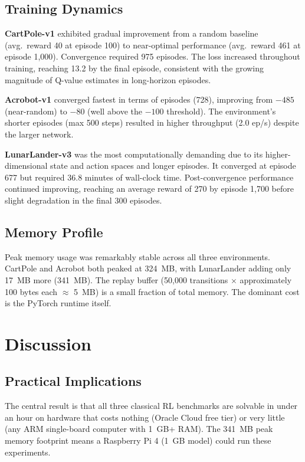 \documentclass[11pt,a4paper]{article}
\begin{document}
\subsection{Training Dynamics}

\textbf{CartPole-v1} exhibited gradual improvement from a random baseline (avg.\ reward 40 at episode 100) to near-optimal performance (avg.\ reward 461 at episode 1,000). Convergence required 975 episodes. The loss increased throughout training, reaching 13.2 by the final episode, consistent with the growing magnitude of Q-value estimates in long-horizon episodes.

\textbf{Acrobot-v1} converged fastest in terms of episodes (728), improving from $-485$ (near-random) to $-80$ (well above the $-100$ threshold). The environment's shorter episodes (max 500 steps) resulted in higher throughput (2.0 ep/s) despite the larger network.

\textbf{LunarLander-v3} was the most computationally demanding due to its higher-dimensional state and action spaces and longer episodes. It converged at episode 677 but required 36.8 minutes of wall-clock time. Post-convergence performance continued improving, reaching an average reward of 270 by episode 1,700 before slight degradation in the final 300 episodes.

\subsection{Memory Profile}

Peak memory usage was remarkably stable across all three environments. CartPole and Acrobot both peaked at 324~MB, with LunarLander adding only 17~MB more (341~MB). The replay buffer (50,000 transitions $\times$ approximately 100 bytes each $\approx$ 5~MB) is a small fraction of total memory. The dominant cost is the PyTorch runtime itself.

\section{Discussion}

\subsection{Practical Implications}

The central result is that all three classical RL benchmarks are solvable in under an hour on hardware that costs nothing (Oracle Cloud free tier) or very little (any ARM single-board computer with 1~GB+ RAM). The 341~MB peak memory footprint means a Raspberry Pi 4 (1~GB model) could run these experiments.
\end{document}

